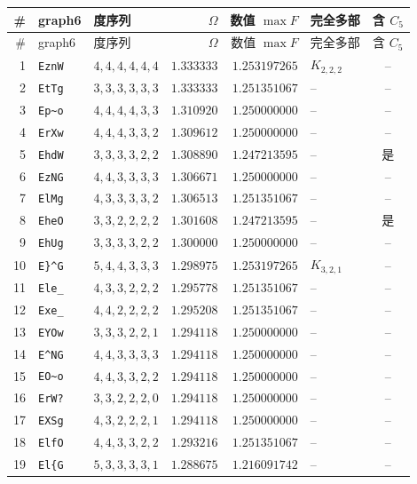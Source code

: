 \documentclass[UTF8,11pt]{ctexart}
\theoremstyle{definition}
\begin{document}
\begin{center}\small
\begin{longtable}{r l l r r l c}
\toprule
\# & graph6 & 度序列 & $\Omega$ & 数值 $\max F$ & 完全多部 & 含 $C_5$\\
\midrule
\endfirsthead
\toprule
\# & graph6 & 度序列 & $\Omega$ & 数值 $\max F$ & 完全多部 & 含 $C_5$\\
\midrule
\endhead
1 & \texttt{EznW} & $4,4,4,4,4,4$ & $1.333333$ & $1.253197265$ & $K_{2,2,2}$ & -- \\
2 & \texttt{EtTg} & $3,3,3,3,3,3$ & $1.333333$ & $1.251351067$ & -- & -- \\
3 & \texttt{Ep\textasciitilde{}o} & $4,4,4,4,3,3$ & $1.310920$ & $1.250000000$ & -- & -- \\
4 & \texttt{ErXw} & $4,4,4,3,3,2$ & $1.309612$ & $1.250000000$ & -- & -- \\
5 & \texttt{EhdW} & $3,3,3,3,2,2$ & $1.308890$ & $1.247213595$ & -- & 是 \\
6 & \texttt{EzNG} & $4,4,3,3,3,3$ & $1.306671$ & $1.250000000$ & -- & -- \\
7 & \texttt{ElMg} & $4,3,3,3,3,2$ & $1.306513$ & $1.251351067$ & -- & -- \\
8 & \texttt{EheO} & $3,3,2,2,2,2$ & $1.301608$ & $1.247213595$ & -- & 是 \\
9 & \texttt{EhUg} & $3,3,3,3,2,2$ & $1.300000$ & $1.250000000$ & -- & -- \\
10 & \texttt{E\}\^{}G} & $5,4,4,3,3,3$ & $1.298975$ & $1.253197265$ & $K_{3,2,1}$ & -- \\
11 & \texttt{Ele\_} & $4,3,3,2,2,2$ & $1.295778$ & $1.251351067$ & -- & -- \\
12 & \texttt{Exe\_} & $4,4,2,2,2,2$ & $1.295208$ & $1.251351067$ & -- & -- \\
13 & \texttt{EYOw} & $3,3,3,2,2,1$ & $1.294118$ & $1.250000000$ & -- & -- \\
14 & \texttt{E\^{}NG} & $4,4,3,3,3,3$ & $1.294118$ & $1.250000000$ & -- & -- \\
15 & \texttt{EO\textasciitilde{}o} & $4,4,3,3,2,2$ & $1.294118$ & $1.250000000$ & -- & -- \\
16 & \texttt{ErW?} & $3,3,2,2,2,0$ & $1.294118$ & $1.250000000$ & -- & -- \\
17 & \texttt{EXSg} & $4,3,2,2,2,1$ & $1.294118$ & $1.250000000$ & -- & -- \\
18 & \texttt{ElfO} & $4,4,3,3,2,2$ & $1.293216$ & $1.251351067$ & -- & -- \\
19 & \texttt{El\{G} & $5,3,3,3,3,1$ & $1.288675$ & $1.216091742$ & -- & -- \\
\bottomrule
\end{longtable}
\end{center}
\end{document}
